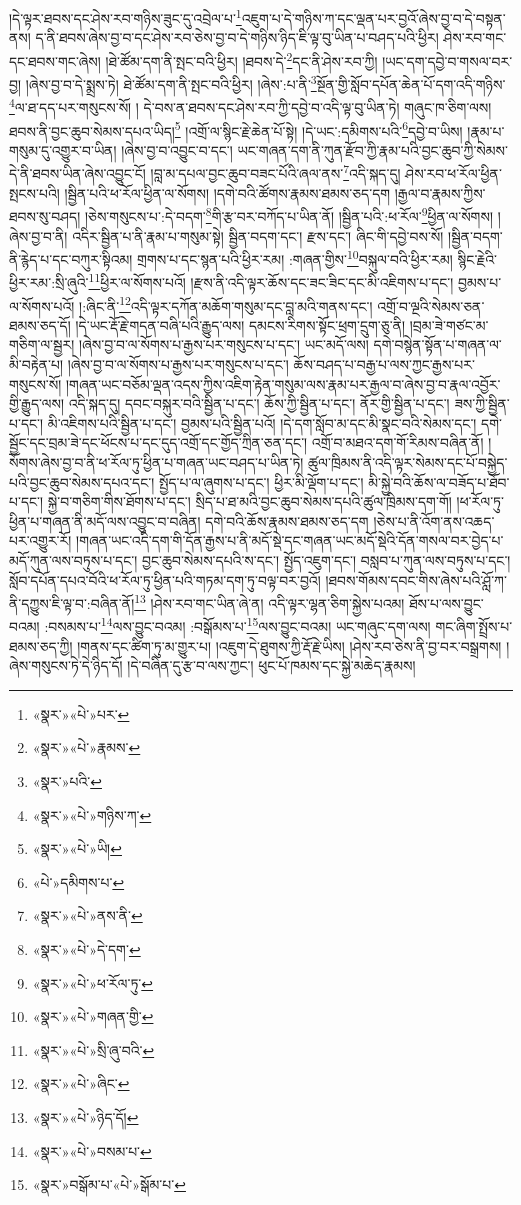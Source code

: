 །དེ་ལྟར་ཐབས་དང་ཤེས་རབ་གཉིས་ཟུང་དུ་འབྲེལ་པ་\footnote{«སྣར་»«པེ་»པར་}འཇུག་པ་དེ་གཉིས་ཀ་དང་ལྡན་པར་བྱའོ་ཞེས་བྱ་བ་དེ་བསྟན་ནས། ད་ནི་ཐབས་ཞེས་བྱ་བ་དང་ཤེས་རབ་ཅེས་བྱ་བ་དེ་གཉིས་ཉིད་ཇི་ལྟ་བུ་ཡིན་པ་བཤད་པའི་ཕྱིར། ཤེས་རབ་གང་དང་ཐབས་གང་ཞེས། །ཐེ་ཚོམ་དག་ནི་སྤང་བའི་ཕྱིར། །ཐབས་དེ་\footnote{«སྣར་»«པེ་»རྣམས་}དང་ནི་ཤེས་རབ་ཀྱི། །ཡང་དག་དབྱེ་བ་གསལ་བར་བྱ། །ཞེས་བྱ་བ་དེ་སྨྲས་ཏེ། ཐེ་ཚོམ་དག་ནི་སྤང་བའི་ཕྱིར། །ཞེས་:པ་ནི་\footnote{«སྣར་»པའི་}སྔོན་གྱི་སློབ་དཔོན་ཆེན་པོ་དག་འདི་གཉིས་\footnote{«སྣར་»«པེ་»གཉིས་ཀ་}ལ་ཐ་དད་པར་གསུངས་སོ། །
དེ་བས་ན་ཐབས་དང་ཤེས་རབ་ཀྱི་དབྱེ་བ་འདི་ལྟ་བུ་ཡིན་ཏེ། གཞུང་ཁ་ཅིག་ལས། ཐབས་ནི་བྱང་ཆུབ་སེམས་དཔའ་ཡིད།\footnote{«སྣར་»«པེ་»ཡི།} །འགྲོ་ལ་སྙིང་རྗེ་ཆེན་པོ་སྟེ། །དེ་ཡང་:དམིགས་པའི་\footnote{«པེ་»དམིགས་པ་}དབྱེ་བ་ཡིས། །རྣམ་པ་གསུམ་དུ་འགྱུར་བ་ཡིན། །ཞེས་བྱ་བ་འབྱུང་བ་དང་། ཡང་གཞན་དག་ནི་ཀུན་རྫོབ་ཀྱི་རྣམ་པའི་བྱང་ཆུབ་ཀྱི་སེམས་དེ་ནི་ཐབས་ཡིན་ཞེས་འབྱུང་ངོ། །བླ་མ་དཔལ་བྱང་ཆུབ་བཟང་པོའི་ཞལ་ནས་\footnote{«སྣར་»«པེ་»ནས་ནི་}འདི་སྐད་དུ། ཤེས་རབ་ཕ་རོལ་ཕྱིན་སྤངས་པའི། །སྦྱིན་པའི་ཕ་རོལ་ཕྱིན་ལ་སོགས། །དགེ་བའི་ཚོགས་རྣམས་ཐམས་ཅད་དག །རྒྱལ་བ་རྣམས་ཀྱིས་ཐབས་སུ་བཤད། །ཅེས་གསུངས་པ་:དེ་བདག་\footnote{«སྣར་»«པེ་»དེ་དག་}གི་རྩ་བར་བཀོད་པ་ཡིན་ནོ། །སྦྱིན་པའི་:ཕ་རོལ་\footnote{«སྣར་»«པེ་»ཕ་རོལ་ཏུ་}ཕྱིན་ལ་སོགས། །ཞེས་བྱ་བ་ནི། འདིར་སྦྱིན་པ་ནི་རྣམ་པ་གསུམ་སྟེ། སྦྱིན་བདག་དང་། རྫས་དང་། ཞིང་གི་དབྱེ་བས་སོ། །སྦྱིན་བདག་ནི་རྙེད་པ་དང་བཀུར་སྟིའམ། གྲགས་པ་དང་སྙན་པའི་ཕྱིར་རམ། :གཞན་གྱིས་\footnote{«སྣར་»«པེ་»གཞན་གྱི་}བསྐུལ་བའི་ཕྱིར་རམ། སྙིང་རྗེའི་ཕྱིར་རམ་:སྲི་ཞུའི་\footnote{«སྣར་»«པེ་»སྲི་ཞུ་བའི་}ཕྱིར་ལ་སོགས་པའོ། །རྫས་ནི་འདི་ལྟར་ཆོས་དང་ཟང་ཟིང་དང་མི་འཇིགས་པ་དང་། བྱམས་པ་ལ་སོགས་པའོ། །:ཞིང་ནི་\footnote{«སྣར་»«པེ་»ཞིང་}འདི་ལྟར་དཀོན་མཆོག་གསུམ་དང་བླ་མའི་གནས་དང་། འགྲོ་བ་ལྔའི་སེམས་ཅན་ཐམས་ཅད་དོ། །དེ་ཡང་རྡོ་རྗེ་གདན་བཞི་པའི་རྒྱུད་ལས། དམངས་རིགས་སྟོང་ཕྲག་དྲུག་ཅུ་ནི། །བྲམ་ཟེ་གཙང་མ་གཅིག་ལ་སྦྱར། །ཞེས་བྱ་བ་ལ་སོགས་པ་རྒྱས་པར་གསུངས་པ་དང་། ཡང་མདོ་ལས། དགེ་བསྙེན་སྟོན་པ་གཞན་ལ་མི་བརྟེན་པ། །ཞེས་བྱ་བ་ལ་སོགས་པ་རྒྱས་པར་གསུངས་པ་དང་། ཆོས་བཤད་པ་བརྒྱ་པ་ལས་ཀྱང་རྒྱས་པར་གསུངས་སོ། །གཞན་ཡང་བཅོམ་ལྡན་འདས་ཀྱིས་འཇིག་རྟེན་གསུམ་ལས་རྣམ་པར་རྒྱལ་བ་ཞེས་བྱ་བ་རྣལ་འབྱོར་གྱི་རྒྱུད་ལས། འདི་སྐད་དུ། དབང་བསྐུར་བའི་སྦྱིན་པ་དང་། ཆོས་ཀྱི་སྦྱིན་པ་དང་། ནོར་གྱི་སྦྱིན་པ་དང་། ཟས་ཀྱི་སྦྱིན་པ་དང་། མི་འཇིགས་པའི་སྦྱིན་པ་དང་། བྱམས་པའི་སྦྱིན་པའོ། །དེ་དག་སློབ་མ་དང་མི་སྣང་བའི་སེམས་དང་། དགེ་སྦྱོང་དང་བྲམ་ཟེ་དང་ཕོངས་པ་དང་དུད་འགྲོ་དང་གྱོད་ཀྲིན་ཅན་དང་། འགྲོ་བ་མཐའ་དག་གོ་རིམས་བཞིན་ནོ། །སོགས་ཞེས་བྱ་བ་ནི་ཕ་རོལ་ཏུ་ཕྱིན་པ་གཞན་ཡང་བཤད་པ་ཡིན་ཏེ། ཚུལ་ཁྲིམས་ནི་འདི་ལྟར་སེམས་དང་པོ་བསྐྱེད་པའི་བྱང་ཆུབ་སེམས་དཔའ་དང་། སྤྱོད་པ་ལ་ཞུགས་པ་དང་། ཕྱིར་མི་ལྡོག་པ་དང་། མི་སྐྱེ་བའི་ཆོས་ལ་བཟོད་པ་ཐོབ་པ་དང་། སྐྱེ་བ་གཅིག་གིས་ཐོགས་པ་དང་། སྲིད་པ་ཐ་མའི་བྱང་ཆུབ་སེམས་དཔའི་ཚུལ་ཁྲིམས་དག་གོ། །ཕ་རོལ་ཏུ་ཕྱིན་པ་གཞན་ནི་མདོ་ལས་འབྱུང་བ་བཞིན། དགེ་བའི་ཆོས་རྣམས་ཐམས་ཅད་དག །ཅེས་པ་ནི་འོག་ནས་འཆད་པར་འགྱུར་རོ། །གཞན་ཡང་འདི་དག་གི་དོན་རྒྱས་པ་ནི་མདོ་སྡེ་དང་གཞན་ཡང་མདོ་སྡེའི་དོན་གསལ་བར་བྱེད་པ་མདོ་ཀུན་ལས་བཏུས་པ་དང་། བྱང་ཆུབ་སེམས་དཔའི་ས་དང་། སྤྱོད་འཇུག་དང་། བསླབ་པ་ཀུན་ལས་བཏུས་པ་དང་། སློབ་དཔོན་དཔའ་བོའི་ཕ་རོལ་ཏུ་ཕྱིན་པའི་གཏམ་དག་ཏུ་བལྟ་བར་བྱའོ། །ཐབས་གོམས་དབང་གིས་ཞེས་པའི་ཤློ་ཀ་ནི་དཀྱུས་ཇི་ལྟ་བ་:བཞིན་ནོ།\footnote{«སྣར་»«པེ་»ཉིད་དོ།} །ཤེས་རབ་གང་ཡིན་ཞེ་ན། འདི་ལྟར་ལྷན་ཅིག་སྐྱེས་པའམ། ཐོས་པ་ལས་བྱུང་བའམ། :བསམས་པ་\footnote{«སྣར་»«པེ་»བསམ་པ་}ལས་བྱུང་བའམ། :བསྒོམས་པ་\footnote{«སྣར་»བསྒོམ་པ་«པེ་»སྒོམ་པ་}ལས་བྱུང་བའམ། ཡང་གཞུང་དག་ལས། གང་ཞིག་སྤྲོས་པ་ཐམས་ཅད་ཀྱི། །གནས་དང་ཚིག་ཏུ་མ་གྱུར་པ། །འཇུག་དེ་ཐུགས་ཀྱི་རྡོ་རྗེ་ཡིས། །ཤེས་རབ་ཅེས་ནི་བྱ་བར་བསྒྲགས། །ཞེས་གསུངས་ཏེ་དེ་ཉིད་དོ། །དེ་བཞིན་དུ་རྩ་བ་ལས་ཀྱང་། ཕུང་པོ་ཁམས་དང་སྐྱེ་མཆེད་རྣམས། 